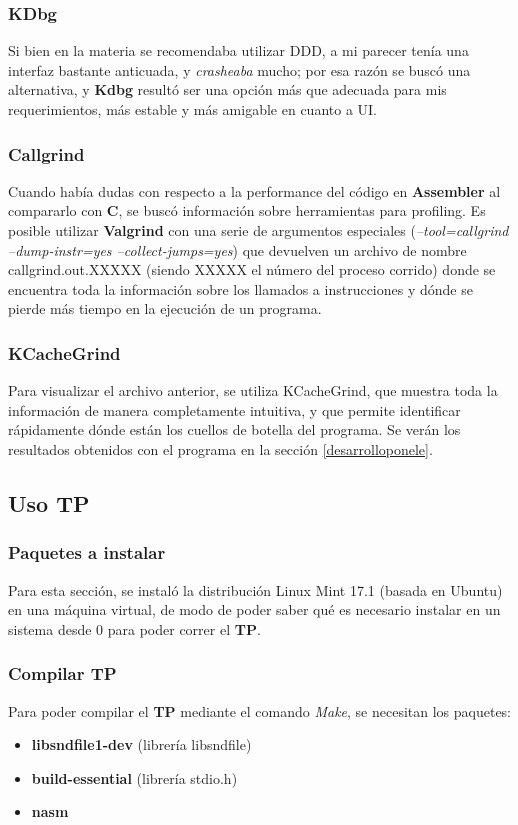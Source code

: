 \documentclass[a4paper,spanish,12pt]{article}
\begin{document}
\subsubsection*{KDbg}
Si bien en la materia se recomendaba utilizar DDD, a mi parecer tenía una interfaz bastante anticuada, y \textit{crasheaba} mucho; por esa razón se buscó una alternativa, y \textbf{Kdbg} resultó ser una opción más que adecuada para mis requerimientos, más estable y más amigable en cuanto a UI.

\subsubsection*{Callgrind}
Cuando había dudas con respecto a la performance del código en \textbf{Assembler} al compararlo con \textbf{C}, se buscó información sobre herramientas para profiling. Es posible utilizar \textbf{Valgrind} con una serie de argumentos especiales (\textit{--tool=callgrind --dump-instr=yes --collect-jumps=yes}) que devuelven un archivo de nombre callgrind.out.XXXXX (siendo XXXXX el número del proceso corrido) donde se encuentra toda la información sobre los llamados a instrucciones y dónde se pierde más tiempo en la ejecución de un programa.

\subsubsection*{KCacheGrind}
Para visualizar el archivo anterior, se utiliza KCacheGrind, que muestra toda la información de manera completamente intuitiva, y que permite identificar rápidamente dónde están los cuellos de botella del programa. Se verán los resultados obtenidos con el programa en la sección \ref{desarrolloponele}.


\newpage\subsection{Uso TP}
\subsubsection{Paquetes a instalar}
\label{subsec:instalar}
Para esta sección, se instaló la distribución Linux Mint 17.1 (basada en Ubuntu) en una máquina virtual, de modo de poder saber qué es necesario instalar en un sistema desde 0 para poder correr el \textbf{TP}.

\subsubsection*{Compilar TP}
Para poder compilar el \textbf{TP} mediante el comando \textit{Make}, se necesitan los paquetes: 
\begin{itemize}
 \item \textbf{libsndfile1-dev} (librería libsndfile)
 \item \textbf{build-essential} (librería stdio.h)
 \item \textbf{nasm}
\end{itemize}
\end{document}

